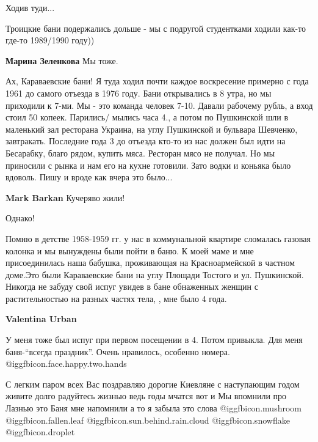 \begin{itemize}
Ходив туди...

Троицкие бани подержались дольше - мы с подругой студентками ходили как-то где-то 1989/1990 году))

\textbf{Марина Зеленкова} Мы тоже.


Ах, Караваевские бани! Я туда ходил почти каждое воскресение примерно с года
1961 до самого отъезда в 1976 году. Бани открывались в 8 утра, но мы приходили
к 7-ми. Мы - это команда человек 7-10. Давали рабочему рубль, а вход стоил 50
копеек. Парились/ мылись часа 4., а потом по Пушкинской шли в маленький зал
ресторана Украина, на углу Пушкинской и бульвара Шевченко, завтракать.
Последние года 3 до отъезда кто-то из нас должен был идти на Бесарабку, благо
рядом, купить мяса. Ресторан мясо не получал. Но мы приносили с рынка и нам его
на кухне готовили. Зато водки и коньяка было вдоволь. Пишу и вроде как вчера
это было...

\begin{itemize} %
\textbf{Mark Barkan} Кучеряво жили!

Однако!
\end{itemize} %


Помню в детстве 1958-1959 гг. у нас в коммунальной квартире сломалась газовая
колонка и мы вынуждены были пойти в баню. К моей маме и мне присоединилась наша
бабушка, проживающая на Красноармейской в частном доме.Это были Караваевские
бани на углу Площади Тостого и ул. Пушкинской. Никогда не забуду свой испуг
увидев в бане обнаженных женщин с растительностью на разных частях тела, , мне
было 4 года.

\begin{itemize} %
\textbf{Valentina Urban}

У меня тоже был испуг при первом посещении в 4. Потом привыкла. Для меня
баня-\enquote{всегда праздник}. Очень нравилось, особенно номера. @igg{fbicon.face.happy.two.hands} 

\end{itemize} %


С легким паром всех Вас поздравляю дорогие Киевляне с наступающим годом живите
долго радуйтесь жизнью ведь годы мчатся вот и Мы впомнили про Лазнью это Баня
мне напомнили а то я забыла это слова  @igg{fbicon.mushroom}
@igg{fbicon.fallen.leaf}  @igg{fbicon.sun.behind.rain.cloud}
@igg{fbicon.snowflake} ️@igg{fbicon.droplet} 


\end{itemize}
